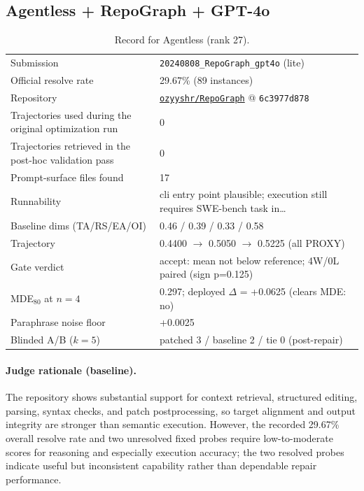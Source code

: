 \subsection{Agentless + RepoGraph + GPT-4o}
\label{app:agent27}
\begin{table}[h]\centering\scriptsize
\caption{Record for Agentless (rank 27).}
\begin{tabular}{lp{8.2cm}}\toprule
Submission & \texttt{20240808\_\allowbreak{}RepoGraph\_\allowbreak{}gpt4o} (lite) \\
Official resolve rate & 29.67\% (89 instances) \\
Repository & \href{https://github.com/ozyyshr/RepoGraph}{\texttt{ozyyshr/RepoGraph}} @ \texttt{6c3977d878} \\
Trajectories used during the original optimization run & 0 \\
Trajectories retrieved in the post-hoc validation pass & 0 \\
Prompt-surface files found & 17 \\
Runnability & cli entry point plausible; execution still requires SWE-bench task in\ldots{} \\
Baseline dims (TA/RS/EA/OI) & 0.46 / 0.39 / 0.33 / 0.58 \\
Trajectory & 0.4400 $\to$ 0.5050 $\to$ 0.5225 (all PROXY) \\
Gate verdict & accept: mean not below reference; 4W/0L paired (sign p=0.125) \\
MDE$_{80}$ at $n{=}4$ & 0.297; deployed $\Delta$ = +0.0625 (clears MDE: no) \\
Paraphrase noise floor & +0.0025 \\
Blinded A/B ($k{=}5$) & patched 3 / baseline 2 / tie 0 (post-repair) \\
\bottomrule\end{tabular}\end{table}
\paragraph{Judge rationale (baseline).}
The repository shows substantial support for context retrieval, structured editing, parsing, syntax checks, and patch postprocessing, so target alignment and output integrity are stronger than semantic execution. However, the recorded 29.67\% overall resolve rate and two unresolved fixed probes require low-to-moderate scores for reasoning and especially execution accuracy; the two resolved probes indicate useful but inconsistent capability rather than dependable repair performance.
